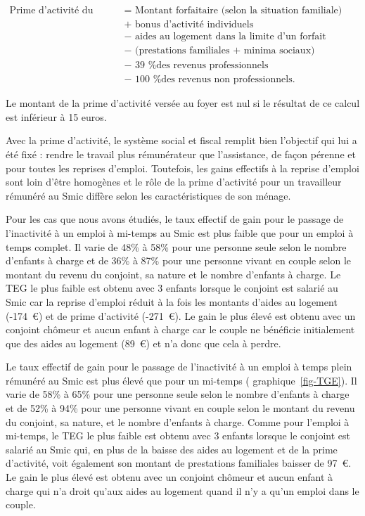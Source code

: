\documentclass[
  french,
]{article}
\begin{document}
\[
\begin{aligned}
\text{Prime d'activité du foyer }&=\text{ Montant forfaitaire (selon la situation familiale)}\\
&+ \text{ bonus d'activité individuels}\\ 
&- \text{ aides au logement dans la limite d'un forfait logement}\\ 
&- \text{ (prestations familiales + minima sociaux)}\\ 
&- \text{ 39 \% des revenus professionnels}\\ 
&- \text{ 100 \% des revenus non professionnels.}
\end{aligned}
\]

Le montant de la prime d'activité versée au foyer est nul si le résultat
de ce calcul est inférieur à 15 euros.

Avec la prime d'activité, le système social et fiscal remplit bien
l'objectif qui lui a été fixé : rendre le travail plus rémunérateur que
l'assistance, de façon pérenne et pour toutes les reprises d'emploi.
Toutefois, les gains effectifs à la reprise d'emploi sont loin d'être
homogènes et le rôle de la prime d'activité pour un travailleur rémunéré
au Smic diffère selon les caractéristiques de son ménage.

Pour les cas que nous avons étudiés, le taux effectif de gain pour le
passage de l'inactivité à un emploi à mi-temps au Smic est plus faible
que pour un emploi à temps complet. Il varie de 48\% à 58\% pour une
personne seule selon le nombre d'enfants à charge et de 36\% à 87\% pour
une personne vivant en couple selon le montant du revenu du conjoint, sa
nature et le nombre d'enfants à charge. Le TEG le plus faible est obtenu
avec 3 enfants lorsque le conjoint est salarié au Smic car la reprise
d'emploi réduit à la fois les montants d'aides au logement (-174~€) et
de prime d'activité (-271~€). Le gain le plus élevé est obtenu avec un
conjoint chômeur et aucun enfant à charge car le couple ne bénéficie
initialement que des aides au logement (89~€) et n'a donc que cela à
perdre.

Le taux effectif de gain pour le passage de l'inactivité à un emploi à
temps plein rémunéré au Smic est plus élevé que pour un mi-temps (
graphique~\ref{fig-TGE}). Il varie de 58\% à 65\% pour une personne
seule selon le nombre d'enfants à charge et de 52\% à 94\% pour une
personne vivant en couple selon le montant du revenu du conjoint, sa
nature, et le nombre d'enfants à charge. Comme pour l'emploi à mi-temps,
le TEG le plus faible est obtenu avec 3 enfants lorsque le conjoint est
salarié au Smic qui, en plus de la baisse des aides au logement et de la
prime d'activité, voit également son montant de prestations familiales
baisser de 97~€. Le gain le plus élevé est obtenu avec un conjoint
chômeur et aucun enfant à charge qui n'a droit qu'aux aides au logement
quand il n'y a qu'un emploi dans le couple.
\end{document}
